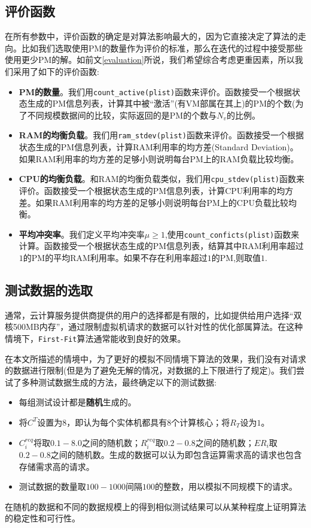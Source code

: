\subsection{评价函数}
\label{sec:evaluation-function}

在所有参数中，评价函数的确定是对算法影响最大的，因为它直接决定了算法的走向。比如我们选取使用PM的数量作为评价的标准，那么在迭代的过程中接受那些使用更少PM的解。如前文\ref{evaluation}所说，我们希望综合考虑更重因素，所以我们采用了如下的评价函数:

\begin{itemize}
\item \textbf{PM的数量}。我们用\texttt{count\_active(plist)}函数来评价。函数接受一个根据状态生成的PM信息列表，计算其中被``激活''(有VM部属在其上)的PM的个数(为了不同规模数据间的比较，实际返回的是PM的个数与$N_v$的比例。
\item \textbf{RAM的均衡负载}。我们用\texttt{ram\_stdev(plist)}函数来评价。函数接受一个根据状态生成的PM信息列表，计算RAM利用率的均方差(Standard Deviation)。如果RAM利用率的均方差的足够小则说明每台PM上的RAM负载比较均衡。
\item \textbf{CPU的均衡负载}。和RAM的均衡负载类似，我们用\texttt{cpu\_stdev(plist)}函数来评价。函数接受一个根据状态生成的PM信息列表，计算CPU利用率的均方差。如果RAM利用率的均方差的足够小则说明每台PM上的CPU负载比较均衡。
\item \textbf{平均冲突率}。我们定义平均冲突率$\mu \geq 1$,使用\texttt{count\_conficts(plist)}函数来计算。函数接受一个根据状态生成的PM信息列表，结算其中RAM利用率超过$1$的PM的平均RAM利用率。如果不存在利用率超过$1$的PM,则取值$1$.
\end{itemize}

\subsection{测试数据的选取}
\label{sec:data}
通常，云计算服务提供商提供的用户的选择都是有限的，比如提供给用户选择``双核500MB内存''，通过限制虚拟机请求的数据可以针对性的优化部属算法。在这种情境下，\texttt{First-Fit}算法通常能收到良好的效果。

在本文所描述的情境中，为了更好的模拟不同情境下算法的效果，我们没有对请求的数据进行限制(但是为了避免无解的情况，对数据的上下限进行了规定)。我们尝试了多种测试数据生成的方法，最终确定以下的测试数据:
\begin{itemize}
\item 每组测试设计都是\textbf{随机}生成的。
\item 将$C^T$设置为$8$，即认为每个实体机都具有$8$个计算核心；将$R_T$设为$1$。
\item $C^{req}_i$将取$0.1-8.0$之间的随机数；$R^{req}_i$取$0.2-0.8$之间的随机数；$ER_i$取$0.2-0.8$之间的随机数。生成的数据可以认为即包含运算需求高的请求也包含存储需求高的请求。
\item 测试数据的数量取$100-1000$间隔$100$的整数，用以模拟不同规模下的请求。
\end{itemize}

在随机的数据和不同的数据规模上的得到相似测试结果可以从某种程度上证明算法的稳定性和可行性。
